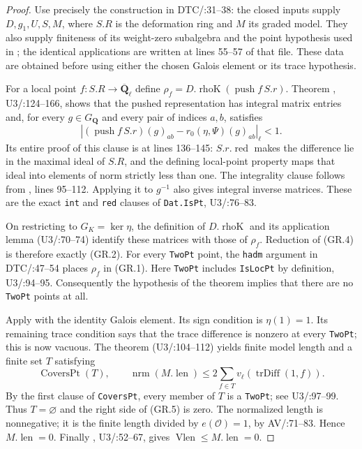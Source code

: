 \documentclass[11pt,a4paper]{article}
\theoremstyle{definition}
\begin{document}
\begin{proof}
Use precisely the construction in
DTC/:31--38: the closed inputs supply
$D,g_1,U,S,M$, where $S.R$ is the deformation ring and $M$
its graded model. They also supply finiteness of its
weight-zero subalgebra and the point hypothesis used in
; the identical applications are written
at lines 55--57 of that file. These data are obtained before
using either the chosen Galois element or its trace hypothesis.

For a local point $f:S.R\to\overline{\mathbf Q}_\ell$ define
$\rho_f=D.\operatorname{rhoK}(\operatorname{push}f\,S.r)$.
Theorem , U3/:124--166,
shows that the pushed representation has integral matrix
entries and, for every $g\in G_{\mathbf Q}$ and every pair of
indices $a,b$, satisfies
\[
 \left| (\operatorname{push}f\,S.r)(g)_{ab}
              -r_0(\eta,\Psi)(g)_{ab}\right|_\ell<1.
                                                               \tag{GR.4}
\]
Its entire proof of this clause is at lines 136--145:
$S.r.\operatorname{red}$ makes the difference lie in the
maximal ideal of $S.R$, and the defining local-point property
maps that ideal into elements of norm strictly less than one.
The integrality clause follows from ,
lines 95--112. Applying it to $g^{-1}$ also gives integral
inverse matrices. These are the exact \texttt{int} and
\texttt{red} clauses of \texttt{Dat.IsPt},
U3/:76--83.

On restricting to $G_K=\ker\eta$, the definition of
$D.\operatorname{rhoK}$ and its application lemma
(U3/:70--74) identify these matrices
with those of $\rho_f$. Reduction of (GR.4) is therefore
exactly (GR.2). For every \texttt{TwoPt} point, the
\texttt{hadm} argument in DTC/:47--54
places $\rho_f$ in (GR.1). Here \texttt{TwoPt} includes
\texttt{IsLocPt} by definition,
U3/:94--95.
Consequently the hypothesis of the theorem implies that
there are no \texttt{TwoPt} points at all.

Apply  with the identity Galois element.
Its sign condition is $\eta(1)=1$. Its remaining trace
condition says that the trace difference is nonzero at
every \texttt{TwoPt}; this is now vacuous. The theorem
(U3/:104--112) yields finite model
length and a finite set $T$ satisfying
\[
 \operatorname{CoversPt}(T),\qquad
 \operatorname{nrm}(M.\operatorname{len})
       \leq2\sum_{f\in T}v_\ell(\operatorname{trDiff}(1,f)).
                                                               \tag{GR.5}
\]
By the first clause of \texttt{CoversPt}, every member of
$T$ is a \texttt{TwoPt}; see U3/:97--99.
Thus $T=\varnothing$ and the right side of (GR.5) is zero.
The normalized length is nonnegative; it is the finite
length divided by $e(\mathcal O)=1$, by
AV/:71--83.
Hence $M.\operatorname{len}=0$. Finally
, U3/:52--67,
gives $\operatorname{Vlen}\leq M.\operatorname{len}=0$.
\end{proof}
\end{document}
